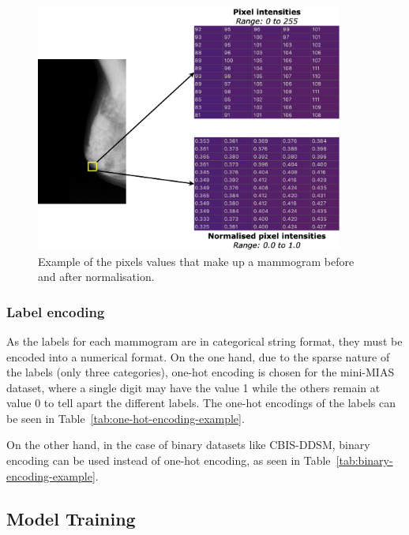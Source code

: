 \begin{figure}[H]
\centerline{\includegraphics[width=0.9\textwidth]{figures/design/Normalisation example.png}}
\caption{\label{fig:design-Normalisation example}Example of the pixels values that make up a mammogram before and after normalisation.}
\end{figure}

\subsubsection{Label encoding}

As the labels for each mammogram are in categorical string format, they must be encoded into a numerical format. On the one hand, due to the sparse nature of the labels (only three categories), one-hot encoding is chosen for the mini-MIAS dataset, where a single digit may have the value 1 while the others remain at value 0 to tell apart the different labels. The one-hot encodings of the labels can be seen in Table~\ref{tab:one-hot-encoding-example}.



On the other hand, in the case of binary datasets like CBIS-DDSM, binary encoding can be used instead of one-hot encoding, as seen in Table~\ref{tab:binary-encoding-example}.




\subsection{Model Training}

